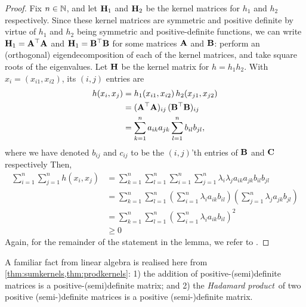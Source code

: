 \begin{proof}
  Fix $n\in\mathbb{N}$, and let ${\mathbf H}_1$ and ${\mathbf H}_2$ be the kernel matrices for $h_1$ and $h_2$ respectively.
  Since these kernel matrices are symmetric and positive definite by virtue of $h_1$ and $h_2$ being symmetric and positive-definite functions, we can write ${\mathbf H}_1 = {\mathbf A}^\top{\mathbf A}$ and ${\mathbf H}_1 = {\mathbf B}^\top{\mathbf B}$ for some matrices ${\mathbf A}$ and ${\mathbf B}$: perform an (orthogonal) eigendecomposition of each of the kernel matrices, and take square roots of the eigenvalues.
  Let ${\mathbf H}$ be the kernel matrix for $h = h_1h_2$.
  With $x_i = (x_{i1}, x_{i2})$, its $(i,j)$ entries are
  \begin{align*}
    h(x_i,x_j)
    &= h_1(x_{i1},x_{i2}) \, h_2(x_{j1},x_{j2}) \\
    &= ({\mathbf A}^\top{\mathbf A})_{ij} \, ({\mathbf B}^\top{\mathbf B})_{ij} \\
    &= \sum_{k=1}^n a_{ik}a_{jk} \sum_{l=1}^n b_{il}b_{jl},
  \end{align*}
  where we have denoted $b_{ij}$ and $c_{ij}$ to be the $(i,j)$'th entries of ${\mathbf B}$ and ${\mathbf C}$ respectively 
  Then,
  \begin{align*}
    \sum_{i=1}^n\sum_{j=1}^n h(x_i,x_j)
    &= \sum_{k=1}^n \sum_{l=1}^n \sum_{i=1}^n \sum_{j=1}^n  \lambda_i \lambda_j a_{ik}a_{jk}b_{il}b_{jl} \\
    &= \sum_{k=1}^n \sum_{l=1}^n \left(\sum_{i=1}^n \lambda_i a_{ik} b_{il} \right) \left( \sum_{j=1}^n  \lambda_j a_{jk}b_{jl} \right) \\
    &= \sum_{k=1}^n \sum_{l=1}^n \left(\sum_{i=1}^n \lambda_i a_{ik} b_{il} \right)^2 \\
    &\geq 0
  \end{align*}
  Again, for the remainder of the statement in the lemma, we refer to \citet[Theorem 13]{berlinet2011reproducing}.
\end{proof}

A familiar fact from linear algebra is realised here from \cref{thm:sumkernels,thm:prodkernels}: 
1) the addition of positive-(semi)definite matrices is a positive-(semi)definite matrix; and 
2) the \emph{Hadamard product}\footnotemark~of two positive (semi-)definite matrices is a positive (semi-)definite matrix.


